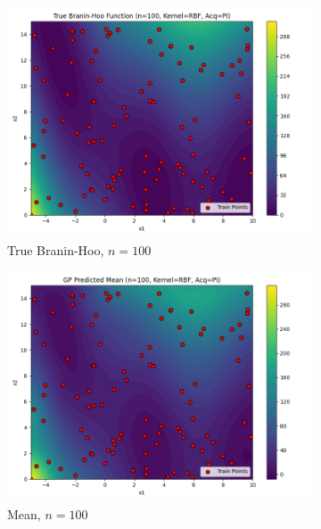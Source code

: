\documentclass[a4paper,12pt]{article}
\begin{document}
\begin{figure}[H]
\begin{subfigure}{0.3\textwidth}
  \includegraphics[width=\linewidth]{Task-02/images/true_function_rbf_n100_PI.png}
  \caption{True Branin-Hoo, $n=100$}
\end{subfigure}
\begin{subfigure}{0.3\textwidth}
    \includegraphics[width=\linewidth]{Task-02/images/gp_mean_rbf_n100_PI.png}
    \caption{Mean, $n=100$}
\end{subfigure}
\begin{subfigure}{0.3\textwidth}

\end{subfigure}
\end{figure}
\end{document}
